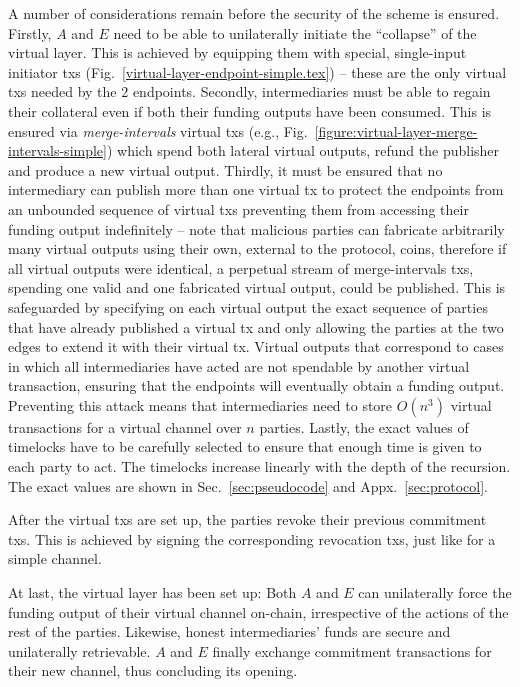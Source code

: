   A number of considerations remain before the security of the scheme is
  ensured. Firstly, $A$ and $E$ need to be able to unilaterally initiate the
  ``collapse'' of the virtual layer. This is achieved by equipping them with
  special, single-input initiator txs
  (Fig.~\ref{virtual-layer-endpoint-simple.tex}) -- these are the only virtual
  txs needed by the $2$ endpoints. Secondly, intermediaries must be able to
  regain their collateral even if both their funding outputs have been consumed.
  This is ensured via \emph{merge-intervals} virtual txs (e.g.,
  Fig.~\ref{figure:virtual-layer-merge-intervals-simple}) which spend both
  lateral virtual outputs, refund the publisher and produce a new virtual
  output. Thirdly, it must be ensured that no intermediary can publish more than
  one virtual tx to protect the endpoints from an unbounded sequence of virtual
  txs preventing them from accessing their funding output indefinitely -- note
  that malicious parties can fabricate arbitrarily many virtual outputs using
  their own, external to the protocol, coins, therefore if all virtual outputs
  were identical, a perpetual stream of merge-intervals txs, spending one valid
  and one fabricated virtual output, could be published. This is safeguarded by
  specifying on each virtual output the exact sequence of parties that have
  already published a virtual tx and only allowing the parties at the two edges
  to extend it with their virtual tx. Virtual outputs that correspond to cases
  in which all intermediaries have acted are not spendable by another virtual
  transaction, ensuring that the endpoints will eventually obtain a funding
  output. Preventing this attack means that intermediaries need to store
  $O(n^3)$ virtual transactions for a virtual channel over $n$ parties. Lastly,
  the exact values of timelocks have to be carefully selected to ensure that
  enough time is given to each party to act. The timelocks increase linearly
  with the depth of the recursion. The exact values are shown in
  Sec.~\ref{sec:pseudocode} and Appx.~\ref{sec:protocol}.

  After the virtual txs are set up, the parties revoke their previous commitment
  txs. This is achieved by signing the corresponding revocation txs, just like
  for a simple channel.

  At last, the virtual layer has been set up: Both $A$ and $E$ can unilaterally
  force the funding output of their virtual channel on-chain, irrespective of
  the actions of the rest of the parties. Likewise, honest intermediaries' funds
  are secure and unilaterally retrievable. $A$ and $E$ finally exchange
  commitment transactions for their new channel, thus concluding its opening.

